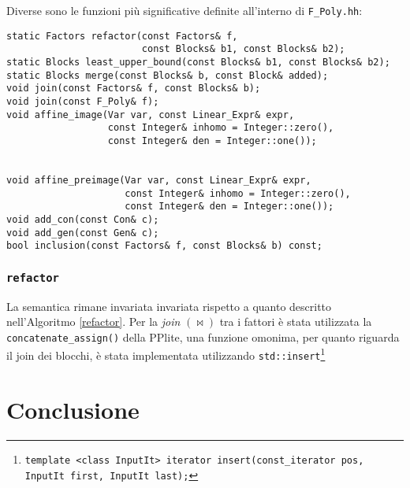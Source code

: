 \documentclass{mimosis}
\theoremstyle{definition}
\begin{document}
Diverse sono le funzioni più significative definite all'interno di \texttt{F\_Poly.hh}:

\begin{verbatim}
static Factors refactor(const Factors& f,
                        const Blocks& b1, const Blocks& b2);
static Blocks least_upper_bound(const Blocks& b1, const Blocks& b2);
static Blocks merge(const Blocks& b, const Block& added);
void join(const Factors& f, const Blocks& b);
void join(const F_Poly& f);
void affine_image(Var var, const Linear_Expr& expr,
                  const Integer& inhomo = Integer::zero(),
                  const Integer& den = Integer::one());


void affine_preimage(Var var, const Linear_Expr& expr,
                     const Integer& inhomo = Integer::zero(),
                     const Integer& den = Integer::one());
void add_con(const Con& c);
void add_gen(const Gen& c);
bool inclusion(const Factors& f, const Blocks& b) const;
\end{verbatim}

\subsection{\texttt{refactor}}
\label{sec:org3656f4e}
La semantica rimane invariata invariata rispetto a quanto descritto
nell'Algoritmo \ref{refactor}. Per la \emph{join} \((\bowtie)\) tra i fattori è stata
utilizzata la \texttt{concatenate\_assign()} della PPlite, una funzione omonima, per
quanto riguarda il join dei blocchi, è stata implementata utilizzando \texttt{std::insert}\footnote{\texttt{template <class InputIt>
iterator insert(const\_iterator pos, InputIt first, InputIt last);}}
\chapter{Conclusione}
\label{sec:org9902a33}


\renewcommand\bibname{Bibliografia}

\end{document}
